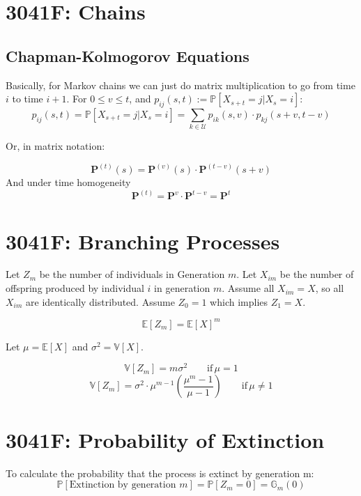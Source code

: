 \section{3041F: Chains}
\subsection{Chapman-Kolmogorov Equations}
Basically, for Markov chains we can just do matrix multiplication to go from time \(i\) to time \(i + 1\).
For \(0 \le v \le t\), and \(p_{ij}(s, t) := \mathbb{P}[X_{s+t} = j | X_s = i]\):
\begin{equation*}
    p_{ij}(s, t) = \mathbb{P}[X_{s+t} = j | X_s = i] = 
    \sum_{k \in \mathcal{U}}p_{ik}(s, v) \cdot p_{kj}(s + v, t - v)
\end{equation*}

Or, in matrix notation:

\begin{equation*}
    \mathbf{P}^{(t)}(s) = \mathbf{P}^{(v)}(s) \cdot \mathbf{P}^{(t-v)}(s + v)
\end{equation*}
And under time homogeneity
\begin{equation*}
    \mathbf{P}^{(t)} = \mathbf{P}^{v} \cdot \mathbf{P}^{t-v} = \mathbf{P}^{t} 
\end{equation*}
\section{3041F: Branching Processes}
Let \(Z_m\) be the number of individuals in Generation \(m\).
Let \(X_{im}\) be the number of offspring produced by individual \(i\) in generation \(m\).
Assume all \(X_{im} = X\), so all \(X_{im}\) are identically distributed.
Assume \(Z_0 = 1\) which implies \(Z_1 = X\).

\begin{equation*}
    \mathbb{E}[Z_m] = \mathbb{E}[X]^m
\end{equation*}

Let \(\mu =\mathbb{E}[X]\) and \(\sigma^2 = \mathbb{V}[X]\).

\begin{equation*}
    \mathbb{V}[Z_m] = m\sigma^2 \qquad \text{if} \, \mu = 1
\end{equation*}
\begin{equation*}
    \mathbb{V}[Z_m] = \sigma^2 \cdot \mu^{m-1} \left( \frac{\mu^{m} - 1}{\mu - 1} \right) \qquad \text{if}\, \mu \ne 1
\end{equation*}
\section{3041F: Probability of Extinction}
To calculate the probability that the process is extinct by generation m:
\begin{equation*}
    \mathbb{P}[\text{Extinction by generation } m] = \mathbb{P}[Z_m = 0] = \mathbb{G}_m(0)
\end{equation*}

